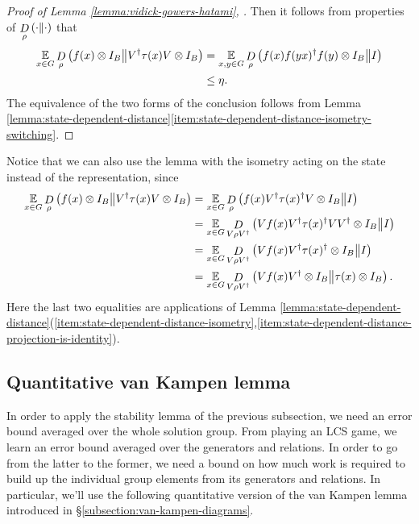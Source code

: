 \begin{proof}[Proof of Lemma \ref{lemma:vidick-gowers-hatami}, \cite{vidick2017approx}]
	Then it follows from properties of $\mathop{D}\limits_{\rho}\left(\cdot\middle\| \cdot\right)$ that
	\begin{align}
		\operatorname*{\mathbb E}\limits_{x\in G} \mathop{D}\limits_{\rho}\left(f(x)\otimes I_B\middle\|  V^\dagger \tau(x) V\otimes I_B\right)
		&=
		\operatorname*{\mathbb E}\limits_{x,y\in G} \mathop{D}\limits_{\rho}\left(f(x)f(yx)^\dagger f(y)\otimes I_B\middle\| I\right) 
		\\&\leq \eta.
	\end{align}
	The equivalence of the two forms of the conclusion follows from Lemma \ref{lemma:state-dependent-distance}\eqref{item:state-dependent-distance-isometry-switching}.
\end{proof}
\noindent Notice that we can also use the lemma with the isometry acting on the state instead of the representation, since
	\begin{align}
		\operatorname*{\mathbb E}\limits_{x\in G} \mathop{D}\limits_{\rho}\left(f(x)\otimes I_B\middle\| V^\dagger \tau(x) V\otimes I_B\right)
		&=\operatorname*{\mathbb E}\limits_{x\in G} \mathop{D}\limits_{\rho}\left(f(x)V^\dagger \tau(x)^\dagger V\otimes I_B\middle\|  I\right)
		\\&=\operatorname*{\mathbb E}\limits_{x\in G} \mathop{D}\limits_{V\rho V^\dagger}\left(Vf(x)V^\dagger \tau(x)^\dagger VV^\dagger\otimes I_B\middle\| I\right)
		\\&=\operatorname*{\mathbb E}\limits_{x\in G} \mathop{D}\limits_{V\rho V^\dagger}\left(Vf(x)V^\dagger \tau(x)^\dagger\otimes I_B\middle\| I\right)
		\\&=\operatorname*{\mathbb E}\limits_{x\in G} \mathop{D}\limits_{V\rho V^\dagger}\left(Vf(x)V^\dagger\otimes I_B\middle\| \tau(x)\otimes I_B\right).
	\end{align}
	Here the last two equalities are applications of Lemma \ref{lemma:state-dependent-distance}(\ref{item:state-dependent-distance-isometry},\ref{item:state-dependent-distance-projection-is-identity}).

\subsection{Quantitative van Kampen lemma}
\label{subsection:quant-van-kampen}

In order to apply the stability lemma of the previous subsection, we need an error bound averaged over the whole solution group. From playing an LCS game, we learn an error bound averaged over the generators and relations. In order to go from the latter to the former, we need a bound on how much work is required to build up the individual group elements from its generators and relations. In particular, we'll use the following quantitative version of the van Kampen lemma introduced in \S \ref{subsection:van-kampen-diagrams}.

